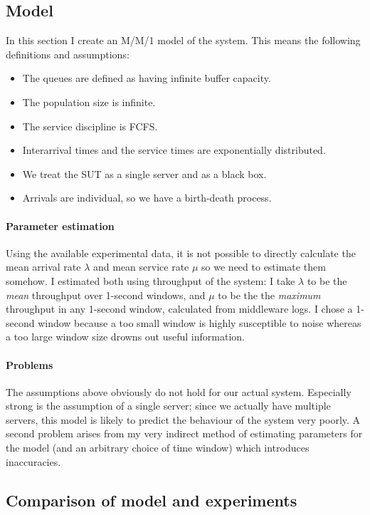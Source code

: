 \documentclass[11pt]{article}
\begin{document}
\subsection{Model}
\label{sec:part1:model}

In this section I create an M/M/1 model of the system. This means the following definitions and assumptions:
\begin{itemize}
	\item The queues are defined as having infinite buffer capacity.
	\item The population size is infinite.
	\item The service discipline is FCFS.
	\item Interarrival times and the service times are exponentially distributed.
	\item We treat the SUT as a single server and as a black box.
	\item Arrivals are individual, so we have a birth-death process.
\end{itemize}
 
\paragraph{Parameter estimation}
Using the available experimental data, it is not possible to directly calculate the mean arrival rate $\lambda$ and mean service rate $\mu$ so we need to estimate them somehow. I estimated both using throughput of the system: I take $\lambda$ to be the \emph{mean} throughput over 1-second windows, and $\mu$ to be the the \emph{maximum} throughput in any 1-second window, calculated from middleware logs. I chose a 1-second window because a too small window is highly susceptible to noise whereas a too large window size drowns out useful information.

\paragraph{Problems}
The assumptions above obviously do not hold for our actual system. Especially strong is the assumption of a single server; since we actually have multiple servers, this model is likely to predict the behaviour of the system very poorly. A second problem arises from my very indirect method of estimating parameters for the model (and an arbitrary choice of time window) which introduces inaccuracies.

\subsection{Comparison of model and experiments}
\end{document}
